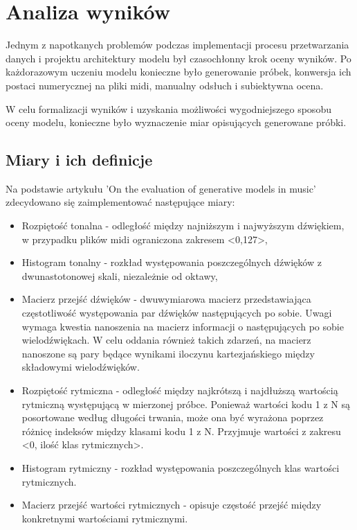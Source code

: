 \chapter{Analiza wyników}
{

    Jednym z napotkanych problemów podczas implementacji procesu przetwarzania danych i projektu architektury modelu
    był czasochłonny krok oceny wyników. Po każdorazowym uczeniu modelu konieczne było generowanie próbek, 
    konwersja ich postaci numerycznej na pliki midi, manualny odsłuch i subiektywna ocena.

    W celu formalizacji wyników i uzyskania możliwości wygodniejszego sposobu oceny modelu, konieczne było wyznaczenie
    miar opisujących generowane próbki. 

    \section{Miary i ich definicje}
    {
        Na podstawie artykułu 'On the evaluation of generative models in music'\cite{Yang2018OnTE} zdecydowano się zaimplementować następujące miary:
        \begin{itemize}
            \item Rozpiętość tonalna - odległość między najniższym i najwyższym dźwiękiem, w przypadku plików midi ograniczona
            zakresem <0,127>,
            \item Histogram tonalny - rozkład występowania poszczególnych dźwięków z dwunastotonowej skali, niezależnie od oktawy, 
            \item Macierz przejść dźwięków - dwuwymiarowa macierz przedstawiająca częstotliwość występowania par dźwięków następujących
            po sobie. Uwagi wymaga kwestia nanoszenia na macierz informacji o następujących po sobie wielodźwiękach. W celu oddania
            również takich zdarzeń, na macierz nanoszone są pary będące wynikami iloczynu kartezjańskiego między składowymi wielodźwięków.
            \item Rozpiętość rytmiczna - odległość między najkrótszą i najdłuższą wartością rytmiczną występującą w mierzonej próbce. 
            Ponieważ wartości kodu 1 z N są posortowane według długości trwania, może ona być wyrażona poprzez różnicę indeksów 
            między klasami kodu 1 z N. Przyjmuje wartości z zakresu <0, ilość klas rytmicznych>.
            \item Histogram rytmiczny - rozkład występowania poszczególnych klas wartości rytmicznych.
            \item Macierz przejść wartości rytmicznych - opisuje częstość przejść między konkretnymi wartościami rytmicznymi.
        \end{itemize}

}}
